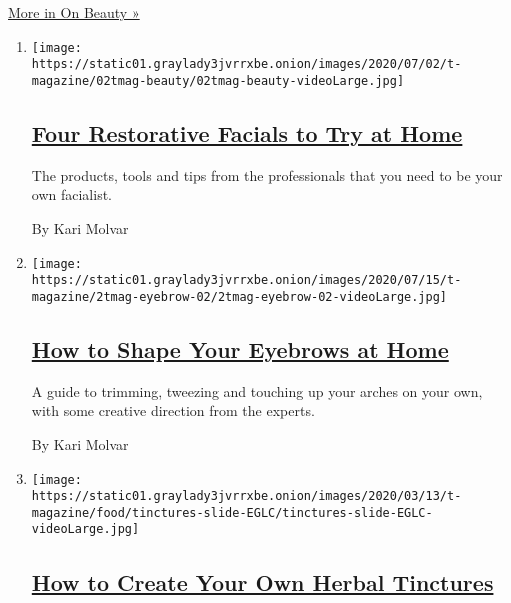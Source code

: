 \href{/column/on-beauty}{More in On Beauty »}

\begin{enumerate}
\def\labelenumi{\arabic{enumi}.}
\item
  \texttt{[image: https://static01.graylady3jvrrxbe.onion/images/2020/07/02/t-magazine/02tmag-beauty/02tmag-beauty-videoLarge.jpg]}

  \hypertarget{four-restorative-facials-to-try-at-home}{%
  \subsection{\texorpdfstring{\href{/2020/07/02/t-magazine/facials-at-home.html}{Four
  Restorative Facials to Try at
  Home}}{Four Restorative Facials to Try at Home}}\label{four-restorative-facials-to-try-at-home}}

  The products, tools and tips from the professionals that you need to
  be your own facialist.

  By Kari Molvar
\item
  \texttt{[image: https://static01.graylady3jvrrxbe.onion/images/2020/07/15/t-magazine/2tmag-eyebrow-02/2tmag-eyebrow-02-videoLarge.jpg]}

  \hypertarget{how-to-shape-your-eyebrows-at-home}{%
  \subsection{\texorpdfstring{\href{/2020/06/18/t-magazine/shape-eyebrows-groom-at-home.html}{How
  to Shape Your Eyebrows at
  Home}}{How to Shape Your Eyebrows at Home}}\label{how-to-shape-your-eyebrows-at-home}}

  A guide to trimming, tweezing and touching up your arches on your own,
  with some creative direction from the experts.

  By Kari Molvar
\item
  \texttt{[image: https://static01.graylady3jvrrxbe.onion/images/2020/03/13/t-magazine/food/tinctures-slide-EGLC/tinctures-slide-EGLC-videoLarge.jpg]}

  \hypertarget{how-to-create-your-own-herbal-tinctures}{%
  \subsection{\texorpdfstring{\href{/2020/06/17/t-magazine/herbal-tinctures-how-to-make.html}{How
  to Create Your Own Herbal
  Tinctures}}{How to Create Your Own Herbal Tinctures}}\label{how-to-create-your-own-herbal-tinctures}}


\end{enumerate}
